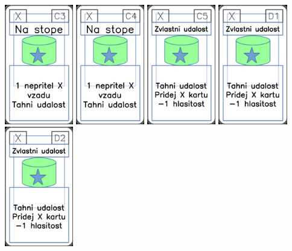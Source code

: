 \documentclass[a4paper]{article}
\begin{document}
	\includegraphics[width=3.0cm]{img-5_12}
	\includegraphics[width=3.0cm]{img-5_13}
	\includegraphics[width=3.0cm]{img-5_14}
	\includegraphics[width=3.0cm]{img-5_15}
	\includegraphics[width=3.0cm]{img-5_16}
\end{document}
